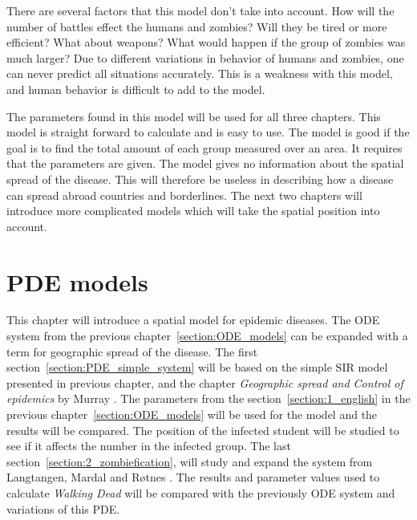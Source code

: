 \documentclass[%
twoside,                 %
final,                   %
chapterprefix=true,      %
open=right               %
10pt]{book}
\begin{document}
\vspace{3mm}




\vspace{3mm}


There are several factors that this model don't take into account. How will the number of battles effect the humans and zombies? Will they be tired or more efficient? What about weapons? What would happen if the group of zombies was much larger? Due to different variations in behavior of humans and zombies, one can never predict all situations accurately. This is a weakness with this model, and human behavior is difficult to add to the model.  


\vspace{3mm}




\vspace{3mm}


The parameters found in this model will be used for all three chapters. This model is straight forward to calculate and is easy to use. The model is good if the goal is to find the total amount of each group measured over an area. It requires that the parameters are given. The model gives no information about the spatial spread of the disease. This will therefore be useless in describing how a disease can spread abroad countries and borderlines. The next two chapters will introduce more complicated models which will take the spatial position into account. 


\chapter{PDE models}
This chapter will introduce a spatial model for epidemic diseases. The ODE system from the previous chapter~\ref{section:ODE_models} can be expanded with a term for geographic spread of the disease. The first section~\ref{section:PDE_simple_system} will be based on the simple SIR model presented in previous chapter, and the chapter \emph{Geographic spread and Control of epidemics} by Murray \cite{murray2003mathematical}. The parameters from the section~\ref{section:1_english} in the previous chapter~\ref{section:ODE_models} will be used for the model and the results will be compared. The position of the infected student will be studied to see if it affects the number in the infected group. The last section~\ref{section:2_zombiefication}, will study and expand the system from Langtangen, Mardal and Røtnes \cite{zombie-math}. The results and parameter values used to calculate \emph{Walking Dead} will be compared with the previously ODE system and variations of this PDE. 
\end{document}
